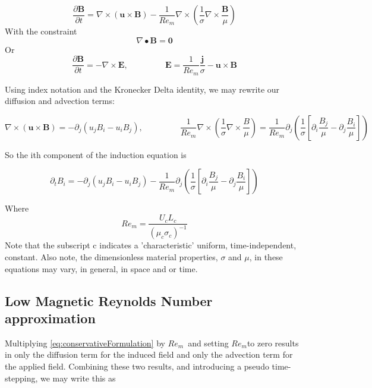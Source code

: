 \documentclass[11pt]{article}
\newcommand{\eqtab}{\;\;\;\;\;\;\;\;\;\;\;\;\;\;\;\;}
\newcommand{\Rem}{$Re_m$}
\begin{document}
\begin{equation} \label{eq:fullInduction}
\frac{\partial \pmb{B}}{\partial t} =
 \nabla \times (\pmb{u} \times \pmb{B})
- \frac{1}{Re_m} \nabla \times \left( \frac{1}{\sigma} \nabla \times \frac{\pmb{B}}{\mu} \right)
\end{equation}
With the constraint
\begin{equation} \label{eq:divB}
\nabla \bullet \pmb{B} = \pmb{0}
\end{equation}
Or
\begin{equation} \label{eq:Faraday}
\frac{\partial \pmb{B}}{\partial t} =
 - \nabla \times \pmb{E}
, \eqtab
 \pmb{E} = \frac{1}{Re_m} \frac{\pmb{j}}{\sigma} - \pmb{u} \times \pmb{B}
\end{equation}

Using index notation and the Kronecker Delta identity, we may rewrite our diffusion and advection terms:

\begin{equation*}
\nabla \times (\pmb{u} \times \pmb{B}) = -\partial_j (u_j B_i - u_i B_j), \eqtab
\frac{1}{Re_m} \nabla \times \left( \frac{1}{\sigma} \nabla \times \frac{B}{\mu} \right) = 
\frac{1}{Re_m} \partial_j \left( \frac{1}{\sigma} \left[ \partial_i \frac{B_j}{\mu} - \partial_j \frac{B_i}{\mu} \right] \right)
\end{equation*}

So the ith component of the induction equation is

\begin{equation} \label{eq:conservativeFormulation}
 \partial_t B_i = 
-\partial_j (u_j B_i - u_i B_j)
-\frac{1}{Re_m} \partial_j \left( \frac{1}{\sigma} \left[ \partial_i \frac{B_j}{\mu} - \partial_j \frac{B_i}{\mu} \right] \right)
\end{equation}

Where
\begin{equation} \label{eq:Rem}
Re_m = \frac{U_c L_c}{(\mu_c \sigma_c)^{-1}}
\end{equation}
Note that the subscript c indicates a 'characteristic' uniform, time-independent, constant. Also note, the dimensionless material properties, $\sigma$ and $\mu$, in these equations may vary, in general, in space and or time.

\subsection{Low Magnetic Reynolds Number approximation}
Multiplying \ref{eq:conservativeFormulation} by \Rem\ and setting \Rem to zero results in only the diffusion term for the induced field and only the advection term for the applied field. Combining these two results, and introducing a pseudo time-stepping, we may write this as
\end{document}
